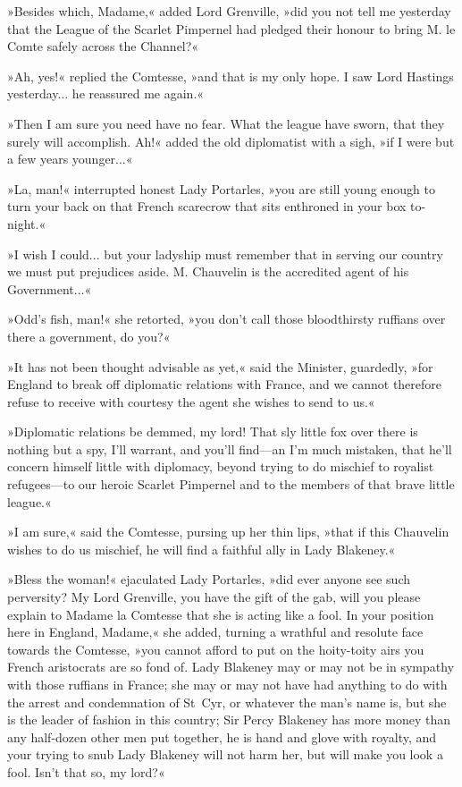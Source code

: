 »Besides which, Madame,« added Lord Grenville, »did you not tell me yesterday that the League of the Scarlet Pimpernel had pledged their honour to bring M. le Comte safely across the Channel?«

»Ah, yes!« replied the Comtesse, »and that is my only hope. I saw Lord Hastings yesterday... he reassured me again.«

»Then I am sure you need have no fear. What the league have sworn, that they surely will accomplish. Ah!« added the old diplomatist with a sigh, »if I were but a few years younger...«

»La, man!« interrupted honest Lady Portarles, »you are still young enough to turn your back on that French scarecrow that sits enthroned in your box to-night.«

»I wish I could... but your ladyship must remember that in serving our country we must put prejudices aside. M. Chauvelin is the accredited agent of his Government...«

»Odd's fish, man!« she retorted, »you don't call those bloodthirsty ruffians over there a government, do you?«

»It has not been thought advisable as yet,« said the Minister, guardedly, »for England to break off diplomatic relations with France, and we cannot therefore refuse to receive with courtesy the agent she wishes to send to us.«

»Diplomatic relations be demmed, my lord! That sly little fox over there is nothing but a spy, I'll warrant, and you'll find\allowbreak---\allowbreak an I'm much mistaken, that he'll concern himself little with diplomacy, beyond trying to do mischief to royalist refugees\allowbreak---\allowbreak to our heroic Scarlet Pimpernel and to the members of that brave little league.«

»I am sure,« said the Comtesse, pursing up her thin lips, »that if this Chauvelin wishes to do us mischief, he will find a faithful ally in Lady Blakeney.«

»Bless the woman!« ejaculated Lady Portarles, »did ever anyone see such perversity? My Lord Grenville, you have the gift of the gab, will you please explain to Madame la Comtesse that she is acting like a fool. In your position here in England, Madame,« she added, turning a wrathful and resolute face towards the Comtesse, »you cannot afford to put on the hoity-toity airs you French aristocrats are so fond of. Lady Blakeney may or may not be in sympathy with those ruffians in France; she may or may not have had anything to do with the arrest and condemnation of St~Cyr, or whatever the man's name is, but she is the leader of fashion in this country; Sir Percy Blakeney has more money than any half-dozen other men put together, he is hand and glove with royalty, and your trying to snub Lady Blakeney will not harm her, but will make you look a fool. Isn't that so, my lord?«

